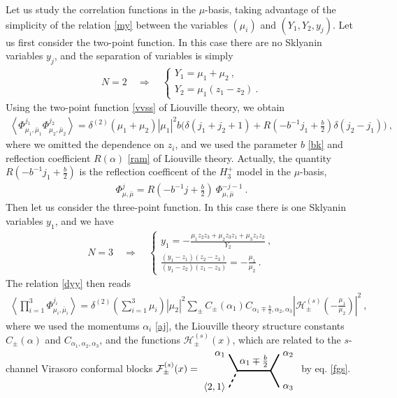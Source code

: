 \documentclass[12pt,a4paper,notitlepage]{report}
\numberwithin{equation}{section}
\theoremstyle{break}
\begin{document}
Let us study the correlation functions in the $\mu$-basis, taking advantage of the simplicity of the relation \eqref{my} between the variables $(\mu_i)$ and $(Y_1,Y_2,y_j)$.
Let us first consider the two-point function.
In this case there are no Sklyanin variables $y_j$, and the separation of variables is simply
\begin{align}
N=2 \quad \Rightarrow \quad \left\{\begin{array}{l} Y_1 = \mu_1+\mu_2\ , \\ Y_2 = \mu_1(z_1-z_2)\ . \end{array} \right.
\end{align}
Using the two-point function \eqref{vvss} of Liouville theory, we obtain 
\begin{align}
 \left\langle \Phi^{j_1}_{\mu_1,\bar{\mu}_1} \Phi^{j_2}_{\mu_2,\bar{\mu}_2}\right\rangle = \delta^{(2)}(\mu_1+\mu_2) |\mu_1|^2 b\Big(\delta(j_1+j_2+1)+R\left(-b^{-1}j_1+\tfrac{b}{2}\right) \delta(j_2-j_1) \Big)\ ,
\end{align}
where we omitted the dependence on $z_i$, and we used the parameter $b$ \eqref{bk} and reflection coefficient $R(\alpha)$ \eqref{ram} of Liouville theory.
Actually, the quantity $R\left(-b^{-1}j_1+\frac{b}{2}\right)$ is the reflection coefficent of the $H_3^+$ model in the $\mu$-basis, 
\begin{align}
 \Phi^j_{\mu,\bar{\mu}} = R(-b^{-1}j+\tfrac{b}{2})\ \Phi^{-j-1}_{\mu,\bar{\mu}} \ .
\end{align}
Then let us consider the three-point function.
In this case there is one Sklyanin variables $y_1$, and we have
\begin{align}
 N=3 \quad \Rightarrow \quad  \left\{\begin{array}{l} y_1 = -\frac{\mu_1z_2z_3+\mu_2z_3z_1+\mu_3z_1z_2}{Y_2}\ , \\ \frac{(y_1-z_1)(z_2-z_3)}{(y_1-z_2)(z_1-z_3)} = -\frac{\mu_1}{\mu_2}\ . \end{array}\right.
\end{align}
The relation \eqref{dyy} then reads 
\begin{align}
 \left\langle \prod_{i=1}^3\Phi^{j_i}_{\mu_i,\bar{\mu}_i} \right\rangle = \delta^{(2)}(\textstyle{\sum}_{i=1}^3\mu_i) |\mu_2|^2 \sum_\pm C_\pm(\alpha_1)C_{\alpha_1\mp\frac{b}{2},\alpha_2,\alpha_3} \left|\mathcal{H}^{(s)}_\pm(-\tfrac{\mu_1}{\mu_2})  \right|^2\ , 
\label{sfpm}
\end{align}
where we used the momentums $\alpha_i$ \eqref{aj}, the Liouville theory structure constants $C_\pm(\alpha)$ and $C_{\alpha_1,\alpha_2,\alpha_3}$, and the functions $\mathcal{H}^{(s)}_\pm(x)$, which are related to the 
$s$-channel Virasoro conformal blocks  
$
 \mathcal{F}^{(s)}_\pm(x)  =  
\begin{tikzpicture}[baseline=(current  bounding  box.center), very thick, scale = .3]
\draw (-1,2) node [left] {$\alpha_1$} -- (0,0) -- node [above] {$\alpha_1\mp \frac{b}{2}$} (4,0) -- (5,2) node [right] {$\alpha_2$};
\draw[dashed] (-1,-2) node [left] {$\langle 2,1 \rangle$} -- (0,0);
\draw (4,0) -- (5,-2) node [right] {$\alpha_3$};
\end{tikzpicture}
$
by eq. \eqref{fgs}. 
\end{document}
